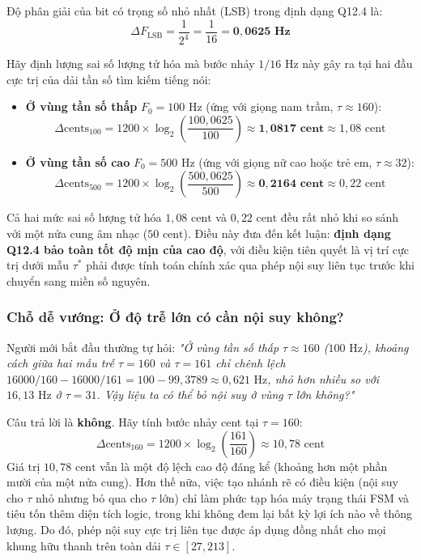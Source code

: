 Độ phân giải của bit có trọng số nhỏ nhất (LSB) trong định dạng Q12.4 là:
\begin{equation}
\Delta F_{\text{LSB}} = \frac{1}{2^4} = \frac{1}{16} = \mathbf{0{,}0625\text{ Hz}}
\end{equation}

Hãy định lượng sai số lượng tử hóa mà bước nhảy $1/16\text{ Hz}$ này gây ra tại hai đầu cực trị của dải tần số tìm kiếm tiếng nói:
\begin{itemize}[leftmargin=1.5em, itemsep=2pt]
    \item \textbf{Ở vùng tần số thấp} $F_0 = 100\text{ Hz}$ (ứng với giọng nam trầm, $\tau \approx 160$):
    \begin{equation}
    \Delta \text{cents}_{100} = 1200 \times \log_2\left( \frac{100{,}0625}{100} \right) \approx \mathbf{1{,}0817\text{ cent}} \approx 1{,}08\text{ cent}
    \end{equation}
    \item \textbf{Ở vùng tần số cao} $F_0 = 500\text{ Hz}$ (ứng với giọng nữ cao hoặc trẻ em, $\tau \approx 32$):
    \begin{equation}
    \Delta \text{cents}_{500} = 1200 \times \log_2\left( \frac{500{,}0625}{500} \right) \approx \mathbf{0{,}2164\text{ cent}} \approx 0{,}22\text{ cent}
    \end{equation}
\end{itemize}

Cả hai mức sai số lượng tử hóa $1{,}08\text{ cent}$ và $0{,}22\text{ cent}$ đều rất nhỏ khi so sánh với một nửa cung âm nhạc ($50\text{ cent}$). Điều này đưa đến kết luận: \textbf{định dạng Q12.4 bảo toàn tốt độ mịn của cao độ}, với điều kiện tiên quyết là vị trí cực trị dưới mẫu $\tau^*$ phải được tính toán chính xác qua phép nội suy liên tục trước khi chuyển sang miền số nguyên.

\subsubsection*{Chỗ dễ vướng: Ở độ trễ lớn có cần nội suy không?}
Người mới bắt đầu thường tự hỏi: \emph{"Ở vùng tần số thấp $\tau \approx 160$ ($100\text{ Hz}$), khoảng cách giữa hai mẫu trễ $\tau = 160$ và $\tau = 161$ chỉ chênh lệch $16000/160 - 16000/161 = 100 - 99{,}3789 \approx 0{,}621\text{ Hz}$, nhỏ hơn nhiều so với $16{,}13\text{ Hz}$ ở $\tau = 31$. Vậy liệu ta có thể bỏ nội suy ở vùng $\tau$ lớn không?"}

Câu trả lời là \textbf{không}. Hãy tính bước nhảy cent tại $\tau = 160$:
\begin{equation}
\Delta \text{cents}_{160} = 1200 \times \log_2\left( \frac{161}{160} \right) \approx 10{,}78\text{ cent}
\end{equation}
Giá trị $10{,}78\text{ cent}$ vẫn là một độ lệch cao độ đáng kể (khoảng hơn một phần mười của một nửa cung). Hơn thế nữa, việc tạo nhánh rẽ có điều kiện (nội suy cho $\tau$ nhỏ nhưng bỏ qua cho $\tau$ lớn) chỉ làm phức tạp hóa máy trạng thái FSM và tiêu tốn thêm diện tích logic, trong khi không đem lại bất kỳ lợi ích nào về thông lượng. Do đó, phép nội suy cực trị liên tục được áp dụng đồng nhất cho mọi khung hữu thanh trên toàn dải $\tau \in [27, 213]$.


